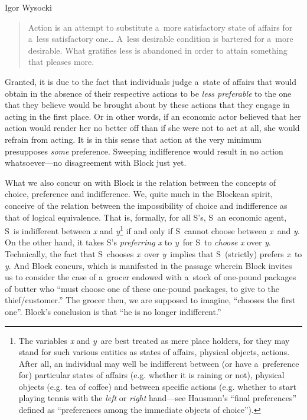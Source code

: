 \begin{artengenv}{Igor Wysocki}
\begin{quote}
Action is an attempt to substitute a~more satisfactory state of affairs for a~less satisfactory one… A~less desirable condition is bartered for a~more desirable. What gratifies less is abandoned in order to attain something that pleases more.
\end{quote}



Granted, it is due to the fact that individuals judge a~state of affairs that would obtain in the absence of their respective actions to be \textit{less preferable} to the one that they believe would be brought about by these actions that they engage in acting in the first place. Or in other words, if an economic actor believed that her action would render her no better off than if she were not to act at all, she would refrain from acting. It is in this sense that action at the very minimum presupposes \textit{some} preference. Sweeping indifference would result in no action whatsoever---no disagreement with Block just yet.



What we also concur on with Block is the relation between the concepts of choice, preference and indifference. We, quite much in the Blockean spirit, conceive of the relation between the impossibility of choice and indifference as that of logical equivalence. That is, formally, for all S's, S~an economic agent, S~is indifferent between \textit{x} and \textit{y}\footnote{The variables \textit{x} and \textit{y}~are best treated as mere place holders, for they may stand for such various entities as states of affairs, physical objects, actions. After all, an individual may well be indifferent between (or have a~preference for) particular states of affairs (e.g. whether it is raining or not), physical objects (e.g. tea of coffee) and between specific actions (e.g. whether to start playing tennis with the \textit{left} or \textit{right} hand---see Hausman's 
\parencite*[][p.27]{hausman_preference_2011} %
 ``final preferences'' defined as ``preferences among the immediate objects of choice''). } if and only if S~cannot choose between \textit{x}~and \textit{y}. On the other hand, it takes S's \textit{preferring x} to \textit{y}~for S~to \textit{choose} \textit{x} over \textit{y}. Technically, the fact that S~chooses \textit{x}~over \textit{y}~implies that S~(strictly) prefers \textit{x}~to \textit{y}. And Block 
\parencite*[][p.47]{block_response_2022} %
 concurs, which is manifested in the passage wherein Block invites us to consider the case of a~grocer endowed with a~stock of one-pound packages of butter who ``must choose one of these one-pound packages, to give to the thief/customer.'' The grocer then, we are supposed to imagine, ``chooses the first one''. Block's conclusion is that ``he is no longer indifferent.''




\end{artengenv}
